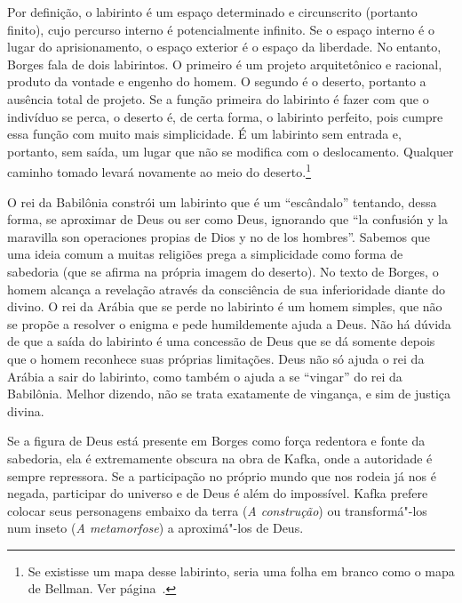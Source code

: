 Por definição, o labirinto é um espaço determinado e circunscrito
(portanto finito), cujo percurso interno é potencialmente infinito. Se o
espaço interno é o lugar do aprisionamento, o espaço exterior é o espaço
da liberdade. No entanto, Borges fala de dois labirintos. O primeiro é
um projeto arquitetônico e racional, produto da vontade e engenho do
homem. O segundo é o deserto, portanto a ausência total de projeto. Se a
função primeira do labirinto é fazer com que o indivíduo se perca, o
deserto é, de certa forma, o labirinto perfeito, pois cumpre essa função
com muito mais simplicidade. É um labirinto sem entrada e, portanto, sem
saída, um lugar que não se modifica com o deslocamento. Qualquer caminho
tomado levará novamente ao meio do deserto.\footnote{Se existisse um
  mapa desse labirinto, seria uma folha em branco como o mapa de
  Bellman. Ver página~\pageref{bellman}.}

O rei da Babilônia constrói um labirinto que é um ``escândalo''
tentando, dessa forma, se aproximar de Deus ou ser como Deus, ignorando
que ``la confusión y la maravilla son operaciones propias de Dios y no
de los hombres''. Sabemos que uma ideia comum a muitas religiões prega a
simplicidade como forma de sabedoria (que se afirma na própria imagem do
deserto). No texto de Borges, o homem alcança a revelação através da
consciência de sua inferioridade diante do divino. O rei da Arábia que
se perde no labirinto é um homem simples, que não se propõe a resolver o
enigma e pede humildemente ajuda a Deus. Não há dúvida de que a saída do
labirinto é uma concessão de Deus que se dá somente depois que o homem
reconhece suas próprias limitações. Deus não só ajuda o rei da Arábia a
sair do labirinto, como também o ajuda a se ``vingar'' do rei da
Babilônia. Melhor dizendo, não se trata exatamente de vingança, e sim de
justiça divina.

Se a figura de Deus está presente em Borges como força redentora e fonte
da sabedoria, ela é extremamente obscura na obra de Kafka, onde a
autoridade é sempre repressora. Se a participação no próprio mundo que
nos rodeia já nos é negada, participar do universo e de Deus é além do
impossível. Kafka prefere colocar seus personagens embaixo da terra
(\emph{A construção}) ou transformá"-los num inseto (\emph{A
metamorfose}) a aproximá"-los de Deus.

